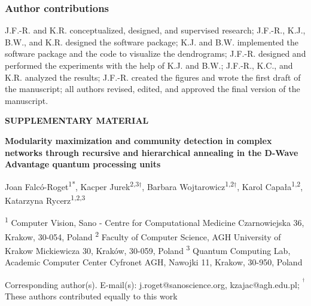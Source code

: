 \documentclass[pdflatex,sn-mathphys-num]{sn-jnl}%
\begin{document}
\subsubsection*{Author contributions}
J.F.-R. and K.R. conceptualized, designed, and supervised research; J.F.-R., K.J., B.W., and K.R. designed the software package; K.J. and B.W. implemented the software package and the code to visualize the dendrograms; J.F.-R. designed and performed the experiments with the help of K.J. and B.W.; J.F.-R., K.C., and K.R. analyzed the results; J.F.-R. created the figures and wrote the first draft of the manuscript; all authors revised, edited, and approved the final version of the manuscript.


\newpage

\begin{centering}
\begin{Large}
\textbf{SUPPLEMENTARY MATERIAL} 
\end{Large}

\begin{large}
\hfill \break
\textbf{Modularity maximization and community detection in complex networks through recursive and hierarchical annealing in the D-Wave Advantage quantum processing units}

\hfill \break
Joan Falc\'o-Roget\textsuperscript{1*}, Kacper Jurek\textsuperscript{2,3}$^{\dagger}$, Barbara Wojtarowicz\textsuperscript{1,2}$^{\dagger}$, Karol Capa{\l}a\textsuperscript{1,2}, Katarzyna Rycerz\textsuperscript{1,2,3}
\end{large}
\end{centering}

\hfill \break
\textsuperscript{1} Computer Vision, Sano - Centre for Computational Medicine Czarnowiejska 36, Krakow, 30-054, Poland
\newline
\textsuperscript{2} Faculty of Computer Science, AGH University of Krakow Mickiewicza 30, Krak\'ow, 30-059, Poland
\newline
\textsuperscript{3} Quantum Computing Lab, Academic Computer Center Cyfronet AGH, Nawojki 11, Krakow, 30-950, Poland 

\hfill \break
Corresponding author(s). E-mail(s): \color{blue} j.roget@sanoscience.org, kzajac@agh.edu.pl\color{black};
\newline
\textsuperscript{$^{\dagger}$} These authors contributed equally to this work 
\setcounter{figure}{0}
\renewcommand{\thefigure}{S\arabic{figure}}
\setcounter{equation}{0}
\renewcommand{\theequation}{S1.\arabic{equation}}
\setcounter{section}{0}
\renewcommand{\thesection}{S\arabic{section}}
\end{document}
